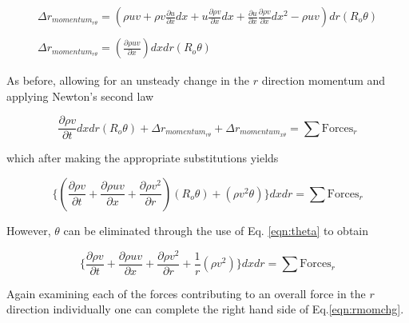 \begin{displaymath}
	\begin{array}{c}
	\Delta r_{momentum_{r \theta}}=(\rho uv + \rho v \frac{\partial u}{\partial x}dx + 
	u \frac{\partial \rho v}{\partial x}dx +
	 \frac{\partial u}{\partial x} \frac{\partial\rho v}{\partial x}dx^2 - \rho uv)dr(R_o \theta) \\ \\
	\Delta r_{momentum_{r \theta}}=(\frac{\partial \rho uv}{\partial x})dxdr(R_o \theta)
	\end{array}
\end{displaymath}

	As before, allowing for an unsteady change in the $r$ direction momentum and applying Newton's second law

\begin{displaymath}
	\frac{\partial \rho v}{\partial t}dxdr(R_o \theta) + \Delta r_{momentum_{r \theta}} + \Delta r_{momentum_{x \theta}} = 
	\sum \textrm{Forces}_r
\end{displaymath}

	which after making the appropriate substitutions yields

\begin{displaymath}
	\Big\{(\frac{\partial \rho v}{\partial t} + \frac{\partial \rho uv}{\partial x} +
	\frac{\partial \rho v^2}{\partial r})(R_o \theta) + (\rho v^2 \theta)\Big\}dxdr = \sum \textrm{Forces}_r
\end{displaymath}

	However, $\theta$ can be eliminated through the use of Eq. \ref{eqn:theta} to obtain

\begin{equation}
	\Big\{\frac{\partial \rho v}{\partial t} + \frac{\partial \rho uv}{\partial x} +
	\frac{\partial \rho v^2}{\partial r} + \frac{1}{r}(\rho v^2)\Big\}dxdr = \sum \textrm{Forces}_r
\label{eqn:rmomchg}
\end{equation}

	Again examining each of the forces contributing to an overall force in the $r$ direction individually one 
can complete the right hand side of Eq.\ref{eqn:rmomchg}.

